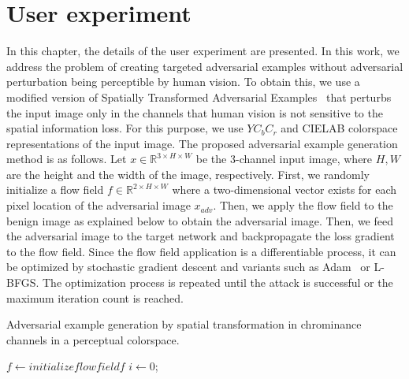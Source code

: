 \chapter{User experiment}
\label{chp:b3}
In this chapter, the details of the user experiment are presented.
In this work, we address the problem of creating targeted adversarial examples without adversarial perturbation being perceptible by human vision. To obtain this, we use a modified version of Spatially Transformed Adversarial Examples~\cite{xiao2018spatially} that perturbs the input image only in the channels that human vision is not sensitive to the spatial information loss. For this purpose, we use \(YC_{b}C_{r}\) and CIELAB colorspace representations of the input image. The proposed adversarial example generation method is as follows. Let \(x \in \mathbb{R}^{3\times H \times W}\) be the 3-channel input image, where \(H, W\) are the height and the width of the image, respectively. First, we randomly initialize a flow field \(f \in \mathbb{R}^{2\times H \times W}\) where a two-dimensional vector exists for each pixel location of the adversarial image \(x_{adv}\). Then, we apply the flow field to the benign image as explained below to obtain the adversarial image. Then, we feed the adversarial image to the target network and backpropagate the loss gradient to the flow field. Since the flow field application is a differentiable process, it can be optimized by stochastic gradient descent and variants such as Adam~\cite{kingma2015adam} or L-BFGS\cite{liu1989limited}. The optimization process is repeated until the attack is successful or the maximum iteration count is reached.
\begin{algorithm}[t]
    \caption{Adversarial example generation by spatial transformation in chrominance channels in a perceptual colorspace. }\label{alg1}
    \(f \gets initialize flow field f\)\;
    \(i \gets 0\);

\end{algorithm}



